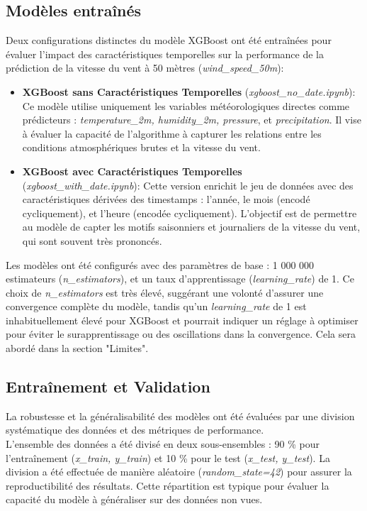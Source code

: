 \documentclass[12pt]{article}
\begin{document}
\subsection{Modèles entraînés}
Deux configurations distinctes du modèle XGBoost ont été entraînées pour évaluer l'impact des caractéristiques temporelles sur la performance de la prédiction de la vitesse du vent à 50 mètres (\textit{wind\_speed\_50m}):
\begin{itemize}[label=$\color{blue}\dagger$]
	\item \textbf{XGBoost sans Caractéristiques Temporelles} (\textit{xgboost\_no\_date.ipynb}): Ce modèle utilise uniquement les variables météorologiques directes comme prédicteurs : \textit{temperature\_2m, humidity\_2m, pressure}, et \textit{precipitation}. Il vise à évaluer la capacité de l'algorithme à capturer les relations entre les conditions atmosphériques brutes et la vitesse du vent.
	\item \textbf{XGBoost avec Caractéristiques Temporelles} (\textit{xgboost\_with\_date.ipynb}): Cette version enrichit le jeu de données avec des caractéristiques dérivées des timestamps : l'année, le mois (encodé cycliquement), et l'heure (encodée cycliquement). L'objectif est de permettre au modèle de capter les motifs saisonniers et journaliers de la vitesse du vent, qui sont souvent très prononcés.
\end{itemize}
Les modèles ont été configurés avec des paramètres de base : 1 000 000 estimateurs (\textit{n\_estimators}), et un taux d'apprentissage (\textit{learning\_rate}) de 1. Ce choix de \textit{n\_estimators} est très élevé, suggérant une volonté d'assurer une convergence complète du modèle, tandis qu'un \textit{learning\_rate} de 1 est inhabituellement élevé pour XGBoost et pourrait indiquer un réglage à optimiser pour éviter le surapprentissage ou des oscillations dans la convergence. Cela sera abordé dans la section "Limites".
\subsection{Entraînement et Validation}
La robustesse et la généralisabilité des modèles ont été évaluées par une division systématique des données et des métriques de performance. \\
L'ensemble des données a été divisé en deux sous-ensembles : 90 \% pour l'entraînement (\textit{x\_train, y\_train}) et 10 \% pour le test (\textit{x\_test, y\_test}). La division a été effectuée de manière aléatoire (\textit{random\_state=42}) pour assurer la reproductibilité des résultats. Cette répartition est typique pour évaluer la capacité du modèle à généraliser sur des données non vues.
\end{document}

